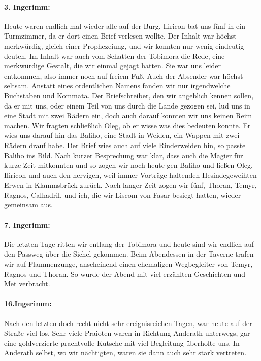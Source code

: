\paragraph{3. Ingerimm:} Heute waren endlich mal wieder alle auf der Burg. Iliricon bat uns fünf in ein Turmzimmer, da er dort einen Brief verlesen wollte. Der Inhalt war höchst merkwürdig, gleich einer Prophezeiung, und wir konnten nur wenig eindeutig deuten. Im Inhalt war auch vom Schatten der Tobimora die Rede, eine merkwürdige Gestalt, die wir einmal gejagt hatten. Sie war uns leider entkommen, also immer noch auf freiem Fuß. Auch der Absender war höchst seltsam. Anstatt eines ordentlichen Namens fanden wir nur irgendwelche Buchstaben und Kommata. Der Briefschreiber, den wir angeblich kennen sollen, da er mit uns, oder einem Teil von uns durch die Lande gezogen sei, lud uns in eine Stadt mit zwei Rädern ein, doch auch darauf konnten wir uns keinen Reim machen. Wir fragten schließlich Oleg, ob er wisse was dies bedeuten konnte. Er wies uns darauf hin das Baliho, eine Stadt in Weiden, ein Wappen mit zwei Rädern drauf habe. Der Brief wies auch auf viele Rinderweiden hin, so passte Baliho ins Bild. Nach kurzer Besprechung war klar, dass auch die Magier für kurze Zeit mitkonnten und so zogen wir noch heute gen Baliho und ließen Oleg, Iliricon und auch den nervigen, weil immer Vorträge haltenden Hesindegeweihten Erwen in Klammsbrück zurück. Nach langer Zeit zogen wir fünf, Thoran, Temyr, Ragnos, Calhadril, und ich, die wir Liscom von Fasar besiegt hatten, wieder gemeinsam aus.

\paragraph{7. Ingerimm:}
Die letzten Tage ritten wir entlang der Tobimora und heute sind wir endlich auf den Passweg über die Sichel gekommen. Beim Abendessen in der Taverne trafen wir auf Flammenzunge, anscheinend einen ehemaligen Wegbegleiter von Temyr, Ragnos und Thoran. So wurde der Abend mit viel erzählten Geschichten und Met verbracht.

\paragraph{16.Ingerimm:}
Nach den letzten doch recht nicht sehr ereignisreichen Tagen, war heute auf der Straße viel los. Sehr viele Praioten waren in Richtung Anderath unterwegs, gar eine goldverzierte prachtvolle Kutsche mit viel Begleitung überholte uns. In Anderath selbst, wo wir nächtigten, waren sie dann auch sehr stark vertreten.

